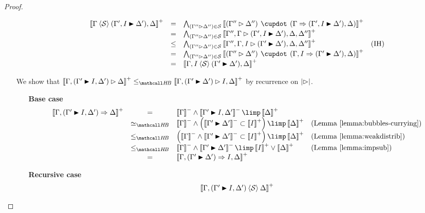 \begin{proof}
\begin{itemize}
\begin{itemize}
$$      \begin{array}{rcll}
        \psint{\Gamma \piq{\cS} (\Gamma', I \JB \Delta'), \Delta}
        &=& \psintAndMix{(\Gamma'' \J \Delta'')}{\cS}{\Gamma}{(\Gamma', I \JB \Delta'), \Delta} & \\
        &=& \psintAnd{(\Gamma'' \J \Delta'')}{\cS}{\Gamma'', \Gamma \J (\Gamma', I \JB \Delta'), \Delta, \Delta''} & \\
        &\sement& \psintAnd{(\Gamma'' \J \Delta'')}{\cS}{\Gamma'', \Gamma, I \J (\Gamma' \JB \Delta'), \Delta, \Delta''} &\text{(IH)} \\
        &=& \psintAndMix{(\Gamma'' \J \Delta'')}{\cS}{\Gamma, I}{(\Gamma' \JB \Delta'), \Delta} & \\
        &=& \psint{\Gamma, I \piq{\cS} (\Gamma' \JB \Delta'), \Delta} & \\
      \end{array}
      $$
    \end{itemize}
    \item[{\rnmsf{f{+}{-}{\downarrow}}}]
    We show that $\psint{\Gamma, (\Gamma' \JB I, \Delta') \J \Delta} \sementHB
    \psint{\Gamma, (\Gamma' \JB \Delta') \J I, \Delta}$ by recurrence on
    $\bradepth{\J}$.
    \begin{itemize}
      \item[\textbf{Base case}]
      $$
      \begin{array}{rcll}
        \psint{\Gamma, (\Gamma' \JB I, \Delta') \seq \Delta}
        &=& \nsint{\Gamma} \land \nsint{\Gamma' \JB I, \Delta'} \limp \psint{\Delta} & \\
        &\semequiv_{\HeytingBrouwer}& \nsint{\Gamma} \land \left(\nsint{\Gamma' \JB \Delta'} \lsub \psint{I}\right) \limp \psint{\Delta} &\text{(\reflemma{bubbles-currying})} \\
        &\sementHB& \left(\nsint{\Gamma} \land \nsint{\Gamma' \JB \Delta'} \lsub \psint{I}\right) \limp \psint{\Delta} &\text{(\reflemma{weakdistrib})} \\
        &\sementHB& \nsint{\Gamma} \land \nsint{\Gamma' \JB \Delta'} \limp \psint{I} \lor \psint{\Delta} &\text{(\reflemma{impsub})} \\
        &=& \psint{\Gamma, (\Gamma' \JB \Delta') \seq I, \Delta} & \\
      \end{array}
      $$
      \item[\textbf{Recursive case}]
      $$
      \begin{array}{rcll}
        \psint{\Gamma, (\Gamma' \JB I, \Delta') \piq{\cS} \Delta}

\end{array}$$
\end{itemize}
\end{itemize}
\end{proof}
